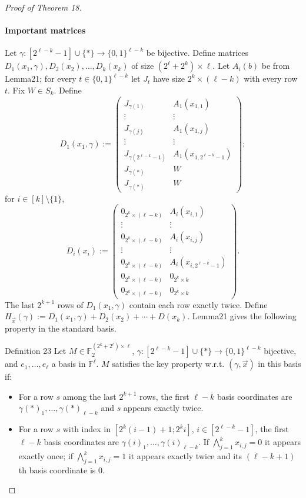 \begin{proof}[Proof of Theorem 18]
\paragraph{Important matrices}
Let $\gamma:[2^{\ell-k}-1]\cup\{*\}\to\{0,1\}^{\ell-k}$ be bijective. Define matrices $D_1(x_1,\gamma),D_2(x_2),\ldots,D_k(x_k)$ of size $(2^\ell+2^k)\times\ell$. Let $A_i(b)$ be from Lemma21; for every $t\in\{0,1\}^{\ell-k}$ let $J_t$ have size $2^k\times(\ell-k)$ with every row $t$. Fix $W\in S_k$. Define
\[
D_1(x_1,\gamma):=\begin{pmatrix}
J_{\gamma(1)}&A_1(x_{1,1})\\\vdots&\vdots\\J_{\gamma(j)}&A_1(x_{1,j})\\\vdots&\vdots\\J_{\gamma(2^{\ell-k}-1)}&A_1(x_{1,2^{\ell-k}-1})\\J_{\gamma(*)}&W\\J_{\gamma(*)}&W
\end{pmatrix};
\]
for $i\in[k]\setminus\{1\}$,
\[
D_i(x_i):=\begin{pmatrix}
0_{2^k\times(\ell-k)}&A_i(x_{i,1})\\\vdots&\vdots\\0_{2^k\times(\ell-k)}&A_i(x_{i,j})\\\vdots&\vdots\\0_{2^k\times(\ell-k)}&A_i(x_{i,2^{\ell-k}-1})\\0_{2^k\times(\ell-k)}&0_{2^k\times k}\\0_{2^k\times(\ell-k)}&0_{2^k\times k}
\end{pmatrix}.
\]
The last $2^{k+1}$ rows of $D_1(x_1,\gamma)$ contain each row exactly twice.
Define $H_{\vec x}(\gamma):=D_1(x_1,\gamma)+D_2(x_2)+\cdots+D(x_k)$. Lemma21 gives the following property in the standard basis.
\begin{authorclaim}{Definition 23}
Let $M\in\mathbb F_2^{(2^k+2^\ell)\times\ell}$, $\gamma:[2^{\ell-k}-1]\cup\{*\}\to\{0,1\}^{\ell-k}$ bijective, and $e_1,\ldots,e_\ell$ a basis in $\mathbb F^\ell$. $M$ satisfies the key property w.r.t. $(\gamma,\vec x)$ in this basis if:
\begin{itemize}
\item For a row $s$ among the last $2^{k+1}$ rows, the first $\ell-k$ basis coordinates are $\gamma(*)_1,\ldots,\gamma(*)_{\ell-k}$ and $s$ appears exactly twice.
\item For a row $s$ with index in $[2^k(i-1)+1;2^ki]$, $i\in[2^{\ell-k}-1]$, the first $\ell-k$ basis coordinates are $\gamma(i)_1,\ldots,\gamma(i)_{\ell-k}$. If $\bigwedge_{j=1}^kx_{i,j}=0$ it appears exactly once; if $\bigwedge_{j=1}^kx_{i,j}=1$ it appears exactly twice and its $(\ell-k+1)$th basis coordinate is 0.

\end{itemize}
\end{authorclaim}
\end{proof}
